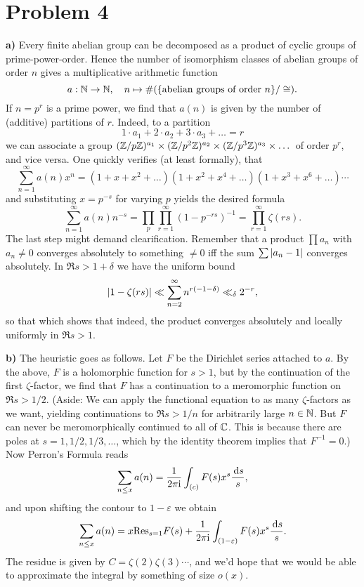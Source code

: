\documentclass[a4paper,11pt]{article}
\begin{document}
\section*{Problem 4}
\textbf{a)} Every finite abelian group can be decomposed as a product of 
cyclic groups of prime-power-order. Hence the number of isomorphism classes 
of abelian groups of order $n$ gives a multiplicative arithmetic function
$$a: \mathbb{N} \to \mathbb{N}, \quad n \mapsto \#(\{\text{abelian groups of order
$n$}\}/\cong).$$ 
If $n = p^r$ is a prime power, we find that $a(n)$ is given by the number of 
(additive) partitions of $r$. Indeed, to a partition
\[
    1 \cdot a_1 + 2\cdot a_2 + 3 \cdot a_3 + \dots  = r 
\]
we can associate a group $(\mathbb{Z}/p\mathbb{Z})^{a_1} \times (\mathbb{Z}/p^{2}\mathbb{Z})^{a_2} \times
(\mathbb{Z}/p^3\mathbb{Z})^{a_3} \times \dots$ of order $p^r$, and vice versa. One quickly verifies
(at least formally), that
\[
    \sum_{n=1}^\infty a(n) x^n = (1+x+x^2+\dots) (1+x^2+x^4+\dots) 
    (1+x^3+x^6+\dots)\cdots
\]
and substituting $x=p^{-s}$ for varying $p$ yields the desired formula
\[
    \sum_{n=1}^\infty a(n) n^{-s} = \prod_{p} \prod_{r=1}^\infty(1-p^{-rs})^{-1}
    = \prod_{r=1}^\infty \zeta(rs).
\]
The last step might demand clearification. Remember that a product $\prod a_n$
with $a_n \neq 0$ converges absolutely to something $\neq 0$ iff the sum $\sum
\left\lvert a_n-1 \right\rvert$ converges absolutely. In $\Re s > 1+\delta$ we have the uniform
bound
\[
    \left\lvert 1-\zeta(rs) \right\rvert \ll \sum_{n=2}^\infty n^{r(-1-\delta)} \ll_\delta 2^{-r},
\]
so that 
which shows that indeed, the product converges absolutely and locally uniformly in
$\Re s > 1$. 

\textbf{b)} The heuristic goes as follows. Let $F$ be the Dirichlet series attached
to $a$. By the above, $F$ is a holomorphic function for $s > 1$, but by 
the continuation of the first $\zeta$-factor, we find that $F$ has a
continuation to a meromorphic function on $\Re s > 1/2$. (Aside: We can apply
the functional equation to as many $\zeta$-factors as we want, yielding
continuations to $\Re s > 1/n$ for arbitrarily large $n \in \mathbb{N}$. But $F$ can
never be meromorphically continued to all of $\mathbb{C}$. This is because there are
poles at $s=1, 1/2, 1/3, \dots$, which by the identity theorem implies that
$F^{-1}=0$.) Now Perron's Formula reads
\[
    \sum_{n \leq x} a(n) = \frac{1}{2 \pi \mathrm i} \int_{(c)} F(s) x^s \frac{\mathrm{\,d} s}s,
\]
and upon shifting the contour to $1-\varepsilon$ we obtain
\[
    \sum_{n \leq x}a(n) = x\text{Res}_{s=1} F(s) + \frac{1}{2 \pi \mathrm i} \int_{(1-\varepsilon)}
    F(s)x^s \frac{\mathrm{\,d} s}s.
\]
The residue is given by $C = \zeta(2) \zeta(3) \cdots$, and we'd hope that we would be able to approximate the integral by something of size 
$o(x)$.
\end{document}
